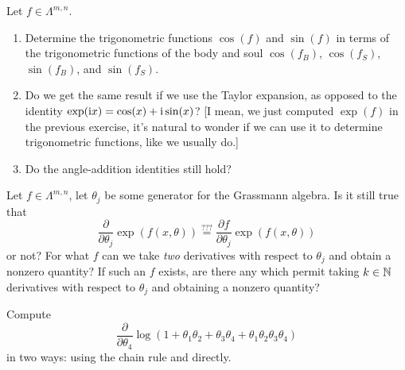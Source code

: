 \begin{exercise}
  Let $f\in\Lambda^{m,n}$.
  \begin{enumerate}
  \item Determine the trigonometric functions $\cos(f)$ and $\sin(f)$ in terms
of the trigonometric functions of the body and soul $\cos(f_{B})$,
$\cos(f_{S})$, $\sin(f_{B})$, and $\sin(f_{S})$.
\item Do we get the same result if we use the Taylor expansion, as opposed to
the identity $\exp(\mathrm{i} x)=\cos(x)+\mathrm{i}\sin(x)$? [I mean, we just computed
  $\exp(f)$ in the previous exercise, it's natural to wonder if we can
  use it to determine trigonometric functions, like we usually do.]
\item Do the angle-addition identities still hold?
  \end{enumerate}
\end{exercise}


\begin{exercise}
Let $f\in\Lambda^{m,n}$, let $\theta_{j}$ be some generator for the
Grassmann algebra. Is it still true that
\begin{equation}
  \frac{\partial}{\partial\theta_{j}}\exp\left(f(x,\theta)\right)
  \stackrel{???}{=} \frac{\partial f}{\partial\theta_{j}}\exp\left(f(x,\theta)\right)
\end{equation}
or not? For what $f$ can we take \emph{two} derivatives with respect to
$\theta_{j}$ and obtain a nonzero quantity? If such an $f$ exists, are
there any which permit taking $k\in\mathbb{N}$ derivatives with respect to
$\theta_{j}$ and obtaining a nonzero quantity?
\end{exercise}

\begin{exercise}[A.~Schwarz 2008]
  Compute
  \begin{equation}
\frac{\partial}{\partial\theta_{4}}\log(1 + \theta_{1}\theta_{2} + \theta_{3}\theta_{4}
+ \theta_{1}\theta_{2}\theta_{3}\theta_{4})
  \end{equation}
in two ways: using the chain rule and directly.
\end{exercise}
